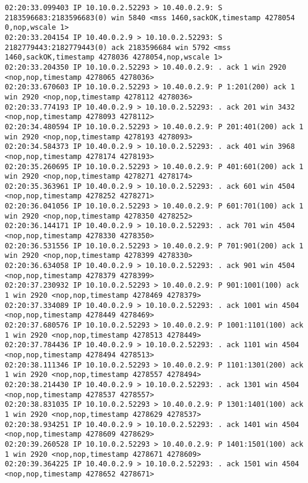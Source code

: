 \documentclass[a4paper,12pt]{article}
\begin{document}
\begin{Verbatim}
02:20:33.099403 IP 10.10.0.2.52293 > 10.40.0.2.9: S 2183596683:2183596683(0) win 5840 <mss 1460,sackOK,timestamp 4278054 0,nop,wscale 1>
02:20:33.204154 IP 10.40.0.2.9 > 10.10.0.2.52293: S 2182779443:2182779443(0) ack 2183596684 win 5792 <mss 1460,sackOK,timestamp 4278036 4278054,nop,wscale 1>
02:20:33.204350 IP 10.10.0.2.52293 > 10.40.0.2.9: . ack 1 win 2920 <nop,nop,timestamp 4278065 4278036>
02:20:33.670603 IP 10.10.0.2.52293 > 10.40.0.2.9: P 1:201(200) ack 1 win 2920 <nop,nop,timestamp 4278112 4278036>
02:20:33.774193 IP 10.40.0.2.9 > 10.10.0.2.52293: . ack 201 win 3432 <nop,nop,timestamp 4278093 4278112>
02:20:34.480594 IP 10.10.0.2.52293 > 10.40.0.2.9: P 201:401(200) ack 1 win 2920 <nop,nop,timestamp 4278193 4278093>
02:20:34.584373 IP 10.40.0.2.9 > 10.10.0.2.52293: . ack 401 win 3968 <nop,nop,timestamp 4278174 4278193>
02:20:35.260695 IP 10.10.0.2.52293 > 10.40.0.2.9: P 401:601(200) ack 1 win 2920 <nop,nop,timestamp 4278271 4278174>
02:20:35.363961 IP 10.40.0.2.9 > 10.10.0.2.52293: . ack 601 win 4504 <nop,nop,timestamp 4278252 4278271>
02:20:36.041056 IP 10.10.0.2.52293 > 10.40.0.2.9: P 601:701(100) ack 1 win 2920 <nop,nop,timestamp 4278350 4278252>
02:20:36.144171 IP 10.40.0.2.9 > 10.10.0.2.52293: . ack 701 win 4504 <nop,nop,timestamp 4278330 4278350>
02:20:36.531556 IP 10.10.0.2.52293 > 10.40.0.2.9: P 701:901(200) ack 1 win 2920 <nop,nop,timestamp 4278399 4278330>
02:20:36.634058 IP 10.40.0.2.9 > 10.10.0.2.52293: . ack 901 win 4504 <nop,nop,timestamp 4278379 4278399>
02:20:37.230932 IP 10.10.0.2.52293 > 10.40.0.2.9: P 901:1001(100) ack 1 win 2920 <nop,nop,timestamp 4278469 4278379>
02:20:37.334089 IP 10.40.0.2.9 > 10.10.0.2.52293: . ack 1001 win 4504 <nop,nop,timestamp 4278449 4278469>
02:20:37.680576 IP 10.10.0.2.52293 > 10.40.0.2.9: P 1001:1101(100) ack 1 win 2920 <nop,nop,timestamp 4278513 4278449>
02:20:37.784436 IP 10.40.0.2.9 > 10.10.0.2.52293: . ack 1101 win 4504 <nop,nop,timestamp 4278494 4278513>
02:20:38.111346 IP 10.10.0.2.52293 > 10.40.0.2.9: P 1101:1301(200) ack 1 win 2920 <nop,nop,timestamp 4278557 4278494>
02:20:38.214430 IP 10.40.0.2.9 > 10.10.0.2.52293: . ack 1301 win 4504 <nop,nop,timestamp 4278537 4278557>
02:20:38.831035 IP 10.10.0.2.52293 > 10.40.0.2.9: P 1301:1401(100) ack 1 win 2920 <nop,nop,timestamp 4278629 4278537>
02:20:38.934251 IP 10.40.0.2.9 > 10.10.0.2.52293: . ack 1401 win 4504 <nop,nop,timestamp 4278609 4278629>
02:20:39.260528 IP 10.10.0.2.52293 > 10.40.0.2.9: P 1401:1501(100) ack 1 win 2920 <nop,nop,timestamp 4278671 4278609>
02:20:39.364225 IP 10.40.0.2.9 > 10.10.0.2.52293: . ack 1501 win 4504 <nop,nop,timestamp 4278652 4278671>

\end{Verbatim}
\end{document}
